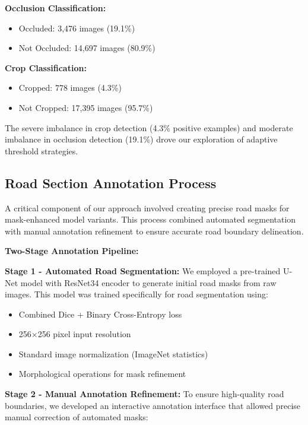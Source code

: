 \documentclass[12pt,twocolumn]{article}
\begin{document}
\textbf{Occlusion Classification:}
\begin{itemize}[itemsep=1pt,parsep=0pt,topsep=2pt]
\item Occluded: 3,476 images (19.1\%)
\item Not Occluded: 14,697 images (80.9\%)
\end{itemize}

\textbf{Crop Classification:}
\begin{itemize}[itemsep=1pt,parsep=0pt,topsep=2pt]
\item Cropped: 778 images (4.3\%)
\item Not Cropped: 17,395 images (95.7\%)
\end{itemize}

The severe imbalance in crop detection (4.3\% positive examples) and moderate imbalance in occlusion detection (19.1\%) drove our exploration of adaptive threshold strategies.

\subsection{Road Section Annotation Process}

A critical component of our approach involved creating precise road masks for mask-enhanced model variants. This process combined automated segmentation with manual annotation refinement to ensure accurate road boundary delineation.

\textbf{Two-Stage Annotation Pipeline:}

\textbf{Stage 1 - Automated Road Segmentation:} We employed a pre-trained U-Net model with ResNet34 encoder to generate initial road masks from raw images. This model was trained specifically for road segmentation using:
\begin{itemize}[itemsep=1pt,parsep=0pt,topsep=2pt]
\item Combined Dice + Binary Cross-Entropy loss
\item 256×256 pixel input resolution
\item Standard image normalization (ImageNet statistics)
\item Morphological operations for mask refinement
\end{itemize}

\textbf{Stage 2 - Manual Annotation Refinement:} To ensure high-quality road boundaries, we developed an interactive annotation interface that allowed precise manual correction of automated masks:
\end{document}
